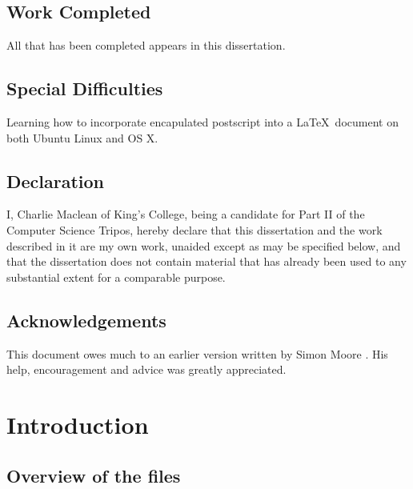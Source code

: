 \documentclass[12pt,a4paper,twoside,openright]{report}
\begin{document}
\section*{Work Completed}

All that has been completed appears in this dissertation.

\section*{Special Difficulties}

Learning how to incorporate encapulated postscript into a \LaTeX\
document on both Ubuntu Linux and OS X.
 
\newpage
\section*{Declaration}

I, Charlie Maclean of King's College, being a candidate for Part II of the 
Computer Science Tripos, hereby declare that this dissertation and the work 
described in it are my own work, unaided except as may be specified below, 
and that the dissertation does not contain material that has already been 
used to any substantial extent for a comparable purpose.

\bigskip
{}

\medskip
{}

\tableofcontents

\listoffigures

\newpage
\section*{Acknowledgements}

This document owes much to an earlier version written by Simon Moore
\cite{Moore95}.  His help, encouragement and advice was greatly 
appreciated.


\pagestyle{headings}

\chapter{Introduction}

\section{Overview of the files}
\end{document}
